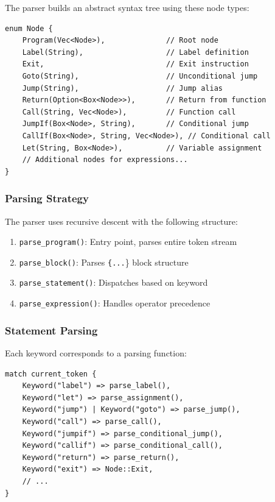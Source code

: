 \documentclass[11pt,a4paper]{article}
\begin{document}
The parser builds an abstract syntax tree using these node types:

\begin{lstlisting}[style=rustcode]
enum Node {
    Program(Vec<Node>),              // Root node
    Label(String),                   // Label definition
    Exit,                            // Exit instruction
    Goto(String),                    // Unconditional jump
    Jump(String),                    // Jump alias
    Return(Option<Box<Node>>),       // Return from function
    Call(String, Vec<Node>),         // Function call
    JumpIf(Box<Node>, String),       // Conditional jump
    CallIf(Box<Node>, String, Vec<Node>), // Conditional call
    Let(String, Box<Node>),          // Variable assignment
    // Additional nodes for expressions...
}
\end{lstlisting}

\subsubsection{Parsing Strategy}

The parser uses recursive descent with the following structure:

\begin{enumerate}
    \item \texttt{parse\_program()}: Entry point, parses entire token stream
    \item \texttt{parse\_block()}: Parses \texttt{\{...}\} block structure
    \item \texttt{parse\_statement()}: Dispatches based on keyword
    \item \texttt{parse\_expression()}: Handles operator precedence
\end{enumerate}

\subsubsection{Statement Parsing}

Each keyword corresponds to a parsing function:

\begin{lstlisting}[style=rustcode]
match current_token {
    Keyword("label") => parse_label(),
    Keyword("let") => parse_assignment(),
    Keyword("jump") | Keyword("goto") => parse_jump(),
    Keyword("call") => parse_call(),
    Keyword("jumpif") => parse_conditional_jump(),
    Keyword("callif") => parse_conditional_call(),
    Keyword("return") => parse_return(),
    Keyword("exit") => Node::Exit,
    // ...
}
\end{lstlisting}
\end{document}
